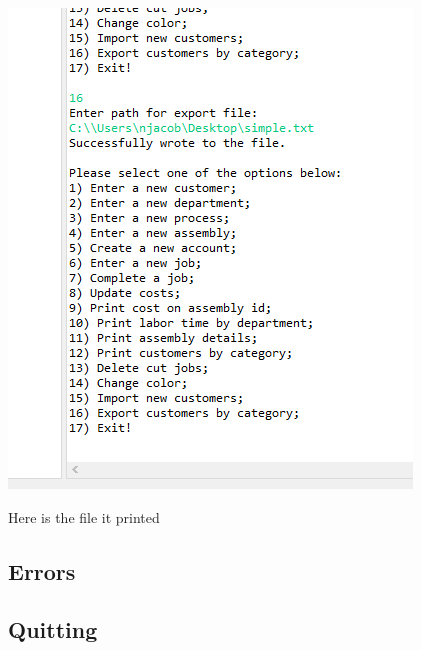 \documentclass[11pt]{article}
\begin{document}
\includegraphics[width = \textwidth]{export.png}

Here is the file it printed


\subsection{Errors}


\subsection{Quitting}
\end{document}
